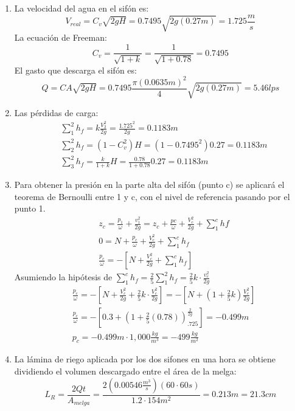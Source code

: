 \begin{enumerate}
    \item La velocidad del agua en el sifón es:
    \begin{equation*}
        V_{real} = C_v \sqrt{2gH} = 0.7495 \sqrt{2g(0.27m)} = 1.725\frac{m}{s}
    \end{equation*}
    La ecuación de Freeman:
    \begin{equation*}
        C_v = \frac{1}{\sqrt{1 + k}} = \frac{1}{\sqrt{1 + 0.78}} =0.7495
    \end{equation*}
    El gasto que descarga el sifón es:
    \begin{equation*}
        Q = CA \sqrt{2gH} =0.7495 \frac{\pi(0.0635m)^2}{4}\sqrt{2g(0.27m)} = 5.46lps
    \end{equation*}
    \item Las pérdidas de carga:
    \begin{align*}
        &\sum_1^2 h_f = k \frac{V_2^2}{2g} = \frac{1.725^2}{2g} = 0.1183m\\
        &\sum_2^2 h_f = \left( 1 - C_v^{2} \right)H =(1 -0.7495^2)0.27 = 0.1183m\\
        &\sum_3^2 h_f = \frac{k}{1 + k}H = \frac{0.78}{1 +0.78}0.27 = 0.1183m
    \end{align*}
    \item Para obtener la presión en la parte alta del sifón (punto c) se aplicará el teorema de Bernoulli entre 1 y c, con el nivel de referencia pasando por el punto 1.
    \begin{align*}
        &z_c = \frac{p_{1}}{\omega} + \frac{v_{1}^2}{2g} = z_c + \frac{pc}{\omega} + \frac{V_c^2}{2g} +\sum_1^c hf\\
        &0 = N + \frac{p_c}{\omega} + \frac{V_c^2}{2g} +\sum_1^c h_f\\
        &\frac{p_c}{\omega} =- \left[N + \frac{V_c^2}{2g} + \sum_1^c h_f\right]
    \end{align*}
    Asumiendo la hipótesis de $\sum_1^c h_f= \frac{2}{5}\sum_1^2 h_f= \frac{2}{5}k\cdot \frac{v_c^2}{2g}$
\begin{align*}
        &\frac{p_c}{\omega} =-\left[N + \frac{V_c^2}{2g} + \frac{2}{5}k \cdot \frac{V_c^2}{2g}\right] =-\left[N +\left(1 + \frac{2}{5}k\right)\frac{V_c^2}{2g}\right]\\
        &\frac{p_c}{\omega} =- \left[0.3 +\left(1 + \frac{2}{5}(0.78)\right)_.725^\frac{2}{2g}\right] =-0.499m\\
        &p_c =-0.499m\cdot 1,000 \frac{kg}{m^3} =- 499 \frac{kg}{m^2}
    \end{align*}
    \item La lámina de riego aplicada por los dos sifones en una hora se obtiene dividiendo el volumen descargado entre el área de la melga:
    \begin{equation*}
        L_R = \frac{2Qt}{A_{melga}} = \frac{2\left( 0.00546 \frac{m^3}{s} \right)(60\cdot 60s)}{1.2\cdot 154m^2} =0.213m = 21.3cm
    \end{equation*}
\end{enumerate}
